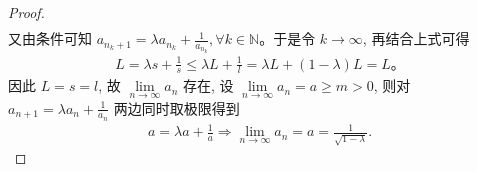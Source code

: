 \documentclass[lang=cn,newtx,10pt,scheme=chinese]{../Template/elegantbook}
\begin{document}
\begin{proof}
\begin{align*}
\end{align*}
又由条件可知 $a_{n_k+1}=\lambda a_{n_k}+\frac{1}{a_{n_k}},\forall k\in \mathbb{N}$。于是令 $k\rightarrow \infty$, 再结合上式可得
\begin{align*}
L=\lambda s+\frac{1}{s}\leqslant \lambda L+\frac{1}{l}=\lambda L+\left( 1-\lambda \right) L=L。
\end{align*}
因此 $L=s=l$, 故 $\underset{n\rightarrow \infty}{\lim}a_n$ 存在, 设 $\underset{n\rightarrow \infty}{\lim}a_n=a\geqslant m>0$, 则对 $a_{n+1}=\lambda a_n+\frac{1}{a_n}$ 两边同时取极限得到
\begin{align*}
a=\lambda a+\frac{1}{a}\Rightarrow \underset{n\rightarrow \infty}{\lim}a_n=a=\frac{1}{\sqrt{1-\lambda}}.
\end{align*}

\end{proof}
\end{document}
